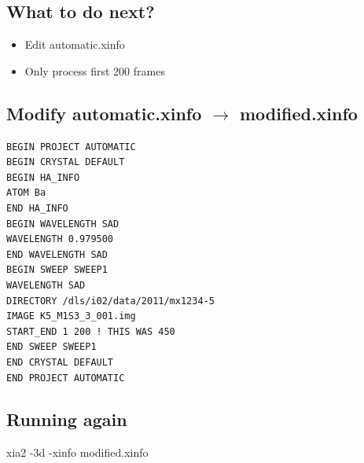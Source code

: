 \documentclass[a4paper, 11pt]{article}
\begin{document}
\subsection{What to do next?}
\begin{itemize}
\item{Edit automatic.xinfo}
\item{Only process first 200 frames}
\end{itemize}

\subsection{Modify automatic.xinfo $\rightarrow$ modified.xinfo}
{\small
\begin{verbatim}
BEGIN PROJECT AUTOMATIC
BEGIN CRYSTAL DEFAULT
BEGIN HA_INFO
ATOM Ba
END HA_INFO
BEGIN WAVELENGTH SAD
WAVELENGTH 0.979500
END WAVELENGTH SAD
BEGIN SWEEP SWEEP1
WAVELENGTH SAD
DIRECTORY /dls/i02/data/2011/mx1234-5
IMAGE K5_M1S3_3_001.img
START_END 1 200 ! THIS WAS 450
END SWEEP SWEEP1
END CRYSTAL DEFAULT
END PROJECT AUTOMATIC
\end{verbatim}
}

\subsection{Running again}
\begin{center}
\huge xia2 -3d -xinfo modified.xinfo
\end{center}
\end{document}
